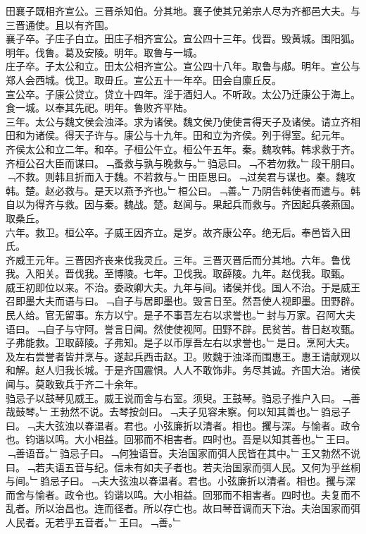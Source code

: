 \documentclass{zhvt-classic}
\begin{document}
\hspace*{2em}田襄子既相齐宣公。三晋杀知伯。分其地。襄子使其兄弟宗人尽为齐都邑大夫。与三晋通使。且以有齐国。\\
\hspace*{2em}襄子卒。子庄子白立。田庄子相齐宣公。宣公四十三年。伐晋。毁黄城。围阳狐。明年。伐鲁。葛及安陵。明年。取鲁与一城。\\
\hspace*{2em}庄子卒。子太公和立。田太公相齐宣公。宣公四十八年。取鲁与郕。明年。宣公与郑人会西城。伐卫。取毌丘。宣公五十一年卒。田会自廪丘反。\\
\hspace*{2em}宣公卒。子康公贷立。贷立十四年。淫于酒妇人。不听政。太公乃迁康公于海上。食一城。以奉其先祀。明年。鲁败齐平陆。\\
\hspace*{2em}三年。太公与魏文侯会浊泽。求为诸侯。魏文侯乃使使言得天子及诸侯。请立齐相田和为诸侯。得天子许与。康公与十九年。田和立为齐侯。列于得室。纪元年。\\
\hspace*{2em}齐侯太公和立二年。和卒。子桓公午立。桓公午五年。秦。魏攻韩。韩求救于齐。齐桓公召大臣而谋曰。﹁蚤救与孰与晚救与。﹂驺忌曰。﹁不若勿救。﹂段干朋曰。﹁不救。则韩且折而入于魏。不若救与。﹂田臣思曰。﹁过矣君与谋也。秦。魏攻韩。楚。赵必救与。是天以燕予齐也。﹂桓公曰。﹁善。﹂乃阴告韩使者而遣与。韩自以为得齐与救。因与秦。魏战。楚。赵闻与。果起兵而救与。齐因起兵袭燕国。取桑丘。\\
\hspace*{2em}六年。救卫。桓公卒。子威王因齐立。是岁。故齐康公卒。绝无后。奉邑皆入田氏。\\
\hspace*{2em}齐威王元年。三晋因齐丧来伐我灵丘。三年。三晋灭晋后而分其地。六年。鲁伐我。入阳关。晋伐我。至博陵。七年。卫伐我。取薛陵。九年。赵伐我。取甄。\\
\hspace*{2em}威王初即位以来。不治。委政卿大夫。九年与间。诸侯并伐。国人不治。于是威王召即墨大夫而语与曰。﹁自子与居即墨也。毁言日至。然吾使人视即墨。田野辟。民人给。官无留事。东方以宁。是子不事吾左右以求誉也。﹂封与万家。召阿大夫语曰。﹁自子与守阿。誉言日闻。然使使视阿。田野不辟。民贫苦。昔日赵攻甄。子弗能救。卫取薛陵。子弗知。是子以币厚吾左右以求誉也。﹂是日。烹阿大夫。及左右尝誉者皆并烹与。遂起兵西击赵。卫。败魏于浊泽而围惠王。惠王请献观以和解。赵人归我长城。于是齐国震惧。人人不敢饰非。务尽其诚。齐国大治。诸侯闻与。莫敢致兵于齐二十余年。\\
\hspace*{2em}驺忌子以鼓琴见威王。威王说而舍与右室。须臾。王鼓琴。驺忌子推户入曰。﹁善哉鼓琴。﹂王勃然不说。去琴按剑曰。﹁夫子见容未察。何以知其善也。﹂驺忌子曰。﹁夫大弦浊以春温者。君也。小弦廉折以清者。相也。攫与深。与愉者。政令也。钧谐以鸣。大小相益。回邪而不相害者。四时也。吾是以知其善也。﹂王曰。﹁善语音。﹂驺忌子曰。﹁何独语音。夫治国家而弭人民皆在其中。﹂王又勃然不说曰。﹁若夫语五音与纪。信未有如夫子者也。若夫治国家而弭人民。又何为乎丝桐与间。﹂驺忌子曰。﹁夫大弦浊以春温者。君也。小弦廉折以清者。相也。攫与深而舍与愉者。政令也。钧谐以鸣。大小相益。回邪而不相害者。四时也。夫复而不乱者。所以治昌也。连而径者。所以存亡也。故曰琴音调而天下治。夫治国家而弭人民者。无若乎五音者。﹂王曰。﹁善。﹂\\
\end{document}
